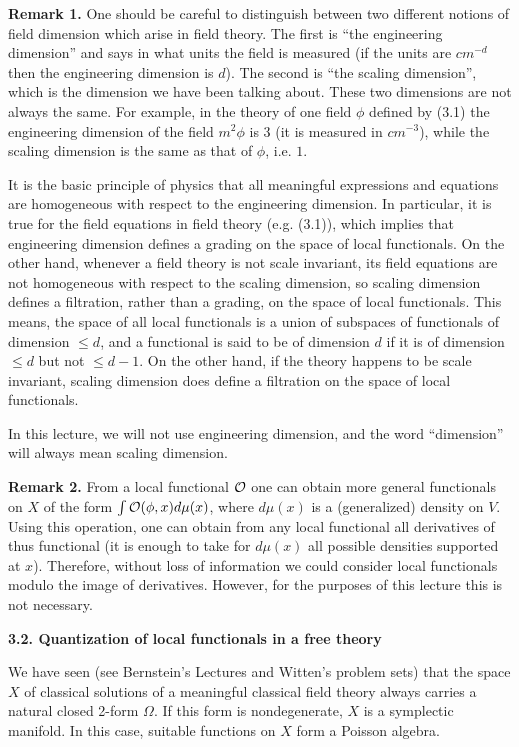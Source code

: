 \documentclass[11pt]{article}
\def\O{{\cal O}}
\begin{document}
{\bf Remark 1.} One should be careful to 
distinguish between two different notions of field dimension
which arise in field theory. The first is ``the engineering dimension''
and says in what units the field is measured
(if the units are $cm^{-d}$ then the engineering dimension is $d$). 
The second is 
``the scaling dimension'', which is the dimension we have been talking about. 
These two dimensions are not always the same. 
For example, in the theory of one field $\phi$ defined by (3.1)
the engineering dimension of the field $m^2\phi$ is 3 (it is measured
in $cm^{-3}$), while the scaling dimension is the same as that of $\phi$, 
i.e. $1$. 

It is the basic principle of physics that all meaningful expressions 
and equations are homogeneous with respect to the engineering dimension. 
In particular, it is true for the field equations 
in field theory (e.g. (3.1)), 
which implies that engineering dimension defines a grading
on the space of local functionals. On the other hand, 
whenever a field theory is not scale invariant, 
its field equations are not homogeneous with respect to the scaling 
dimension,  so scaling dimension defines a filtration, rather than 
a grading, on the space of local functionals. This means, the space 
of all local functionals is a union of subspaces of functionals of dimension
$\le d$, and a functional is said to be of dimension $d$ if it is of 
dimension $\le d$ but not $\le d-1$. On the other hand, 
if the theory happens to be scale invariant, scaling dimension 
does define a filtration on the space of local functionals. 

In this lecture, we will not use engineering dimension, and the word 
``dimension'' will always mean scaling dimension. 

{\bf Remark 2.}  From a local functional $\O$ 
one can obtain more general functionals on $X$ of
the form $\int \O(\phi,x)d\mu(x)$, where $d\mu(x)$ is a (generalized) 
density on $V$. Using this operation, one can obtain from any local
functional all derivatives of thus functional (it is enough to 
take for $d\mu(x)$ all possible densities supported at $x$).
Therefore, without loss of information we could consider local functionals
modulo the image of derivatives. However, for the purposes of this lecture 
this is not necessary.   

{\bf 3.2. Quantization of local functionals in a free theory}

We have seen (see Bernstein's Lectures and Witten's problem sets) 
that the space $X$ 
of classical solutions of a meaningful classical field theory
always carries a natural closed 2-form $\Omega$. If this form is 
nondegenerate, $X$ is a symplectic manifold. In this case, suitable
functions on $X$ form a Poisson algebra. 
\end{document}
